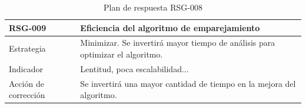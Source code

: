 \begin{table}[htpb]
\centering
\begin{tabularx}{\textwidth}{|l|X|}
\hline
\textbf{RSG-009}              & \textbf{Eficiencia del algoritmo de emparejamiento}                                                                                                                                                              \\ \hline
Estrategia & Minimizar. Se invertirá mayor tiempo de análisis para optimizar el algoritmo. \\ \hline
Indicador            & Lentitud, poca escalabilidad... \\ \hline
Acción de corrección & Se invertirá una mayor cantidad de tiempo en la mejora del algoritmo. \\ \hline
\end{tabularx}
\caption{Plan de respuesta RSG-008}
\end{table}






